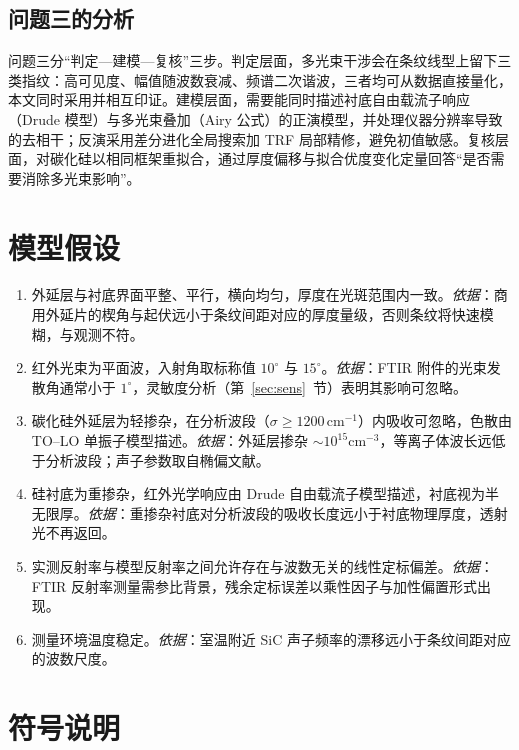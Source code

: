 \documentclass[11pt,a4paper,fontset=fandol]{ctexart}
\newcommand{\invcm}{\,\mathrm{cm^{-1}}}
\begin{document}
\subsection{问题三的分析}
问题三分``判定—建模—复核''三步。判定层面，多光束干涉会在条纹线型上留下三类指纹：高可见度、幅值随波数衰减、频谱二次谐波，三者均可从数据直接量化，本文同时采用并相互印证。建模层面，需要能同时描述衬底自由载流子响应（Drude 模型）与多光束叠加（Airy 公式）的正演模型，并处理仪器分辨率导致的去相干；反演采用差分进化全局搜索加 TRF 局部精修，避免初值敏感。复核层面，对碳化硅以相同框架重拟合，通过厚度偏移与拟合优度变化定量回答``是否需要消除多光束影响''。

\section{模型假设}
\begin{enumerate}[label=\textbf{假设\arabic*：}, leftmargin=3.6em, itemsep=0.15em]
    \item 外延层与衬底界面平整、平行，横向均匀，厚度在光斑范围内一致。\emph{依据}：商用外延片的楔角与起伏远小于条纹间距对应的厚度量级，否则条纹将快速模糊，与观测不符。
    \item 红外光束为平面波，入射角取标称值 $10^\circ$ 与 $15^\circ$。\emph{依据}：FTIR 附件的光束发散角通常小于 $1^\circ$，灵敏度分析（第~\ref{sec:sens}~节）表明其影响可忽略。
    \item 碳化硅外延层为轻掺杂，在分析波段（$\sigma\ge1200\invcm$）内吸收可忽略，色散由 TO--LO 单振子模型描述。\emph{依据}：外延层掺杂 $\sim10^{15}\mathrm{cm}^{-3}$，等离子体波长远低于分析波段；声子参数取自椭偏文献\cite{madan2024}。
    \item 硅衬底为重掺杂，红外光学响应由 Drude 自由载流子模型描述，衬底视为半无限厚。\emph{依据}：重掺杂衬底对分析波段的吸收长度远小于衬底物理厚度，透射光不再返回。
    \item 实测反射率与模型反射率之间允许存在与波数无关的线性定标偏差。\emph{依据}：FTIR 反射率测量需参比背景，残余定标误差以乘性因子与加性偏置形式出现。
    \item 测量环境温度稳定。\emph{依据}：室温附近 SiC 声子频率的漂移远小于条纹间距对应的波数尺度\cite{tong2018}。
\end{enumerate}

\section{符号说明}
\end{document}
